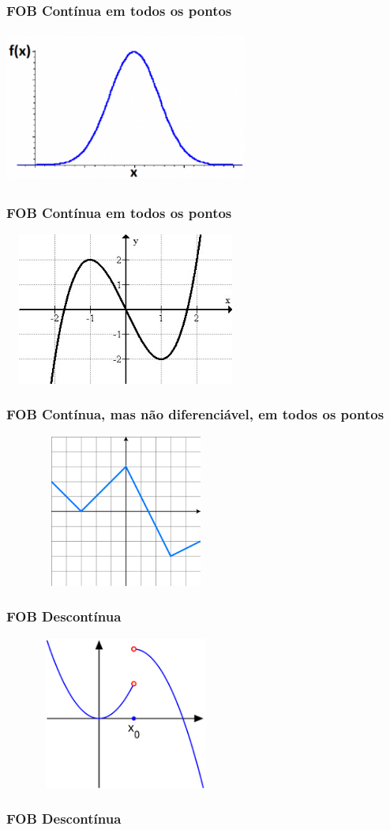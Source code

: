 \documentclass{beamer}
\begin{document}
\begin{frame}
	\centering
	{
	\frametitle{FOB Contínua em todos os pontos}
	\includegraphics[width=8cm,height=5cm]{continua1.png}	
	}
	{
	\frametitle{FOB Contínua em todos os pontos}
	\includegraphics[width=8cm,height=5cm]{continua2.jpg}	
	}
	{
	\frametitle{FOB Contínua, mas não diferenciável, em todos os pontos}
	\includegraphics[width=8cm,height=5cm]{naodiferenciavel.png}	
	}
	{
	\frametitle{FOB Descontínua}
	\includegraphics[width=8cm,height=5cm]{descontinua1.png}	
	}
	{
	\frametitle{FOB Descontínua}
}
\end{frame}
\end{document}
